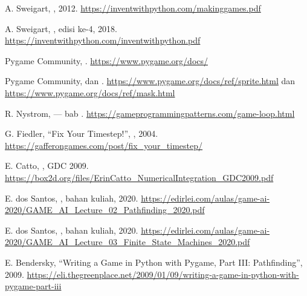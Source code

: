 \begin{sloppypar}
\begin{enumerate}[label={[R\arabic*]}, leftmargin=3.2em, itemsep=4pt, topsep=4pt]
  \item A. Sweigart, , 2012.
        \url{https://inventwithpython.com/makinggames.pdf}

  \item A. Sweigart, ,
        edisi ke-4, 2018.
        \url{https://inventwithpython.com/inventwithpython.pdf}

  \item Pygame Community, . \url{https://www.pygame.org/docs/}

  \item Pygame Community,  dan
        . \url{https://www.pygame.org/docs/ref/sprite.html} dan
        \url{https://www.pygame.org/docs/ref/mask.html}

  \item R. Nystrom,  --- bab
        .
        \url{https://gameprogrammingpatterns.com/game-loop.html}

  \item G. Fiedler, ``Fix Your Timestep!'', , 2004.
        \url{https://gafferongames.com/post/fix_your_timestep/}

  \item E. Catto, , GDC 2009.
        \url{https://box2d.org/files/ErinCatto_NumericalIntegration_GDC2009.pdf}

  \item E. dos Santos, , bahan kuliah, 2020.
        \url{https://edirlei.com/aulas/game-ai-2020/GAME_AI_Lecture_02_Pathfinding_2020.pdf}

  \item E. dos Santos, , bahan kuliah,
        2020.
        \url{https://edirlei.com/aulas/game-ai-2020/GAME_AI_Lecture_03_Finite_State_Machines_2020.pdf}

  \item E. Bendersky, ``Writing a Game in Python with Pygame, Part III:
        Pathfinding'', 2009.
        \url{https://eli.thegreenplace.net/2009/01/09/writing-a-game-in-python-with-pygame-part-iii}


\end{enumerate}
\end{sloppypar}
